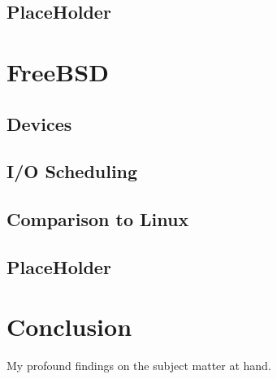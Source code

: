 \documentclass[draftclsnofoot,onecolumn,10pt]{IEEEtran}
\begin{document}
\subsection{PlaceHolder}

\section{FreeBSD}

\subsection{Devices}

\subsection{I/O Scheduling}

\subsection{Comparison to Linux}

\subsection{PlaceHolder}

\section{Conclusion}
My profound findings on the subject matter at hand.
\end{document}
